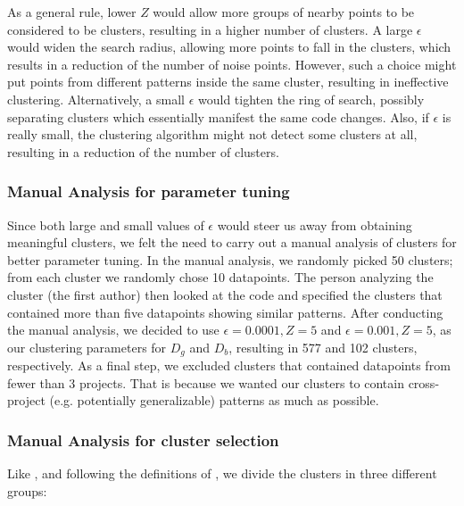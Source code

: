 As a general rule, lower $Z$ would allow more groups of nearby points to be considered to be clusters, resulting in a higher number of clusters. A large $\epsilon$ would widen the search radius, allowing more points to fall in the clusters, which results in a reduction of the number of noise points. However, such a choice might put points from different patterns inside the same cluster, resulting in ineffective clustering. Alternatively, a small $\epsilon$ would tighten the ring of search, possibly separating clusters which essentially manifest the same code changes. Also, if $\epsilon$ is really small, the clustering algorithm might not detect some clusters at all, resulting in a reduction of the number of clusters. 

\subsubsection{\label{sec:manual_analysis_parameter_tuning}Manual Analysis for parameter tuning}

Since both large and small values of $\epsilon$ would steer us away from obtaining meaningful clusters, we felt the need to carry out a manual analysis of clusters for better parameter tuning. In the manual analysis, we randomly picked 50 clusters; from each cluster we randomly chose 10 datapoints. The person analyzing the cluster (the first author) then looked at the code and specified the clusters that contained more than five datapoints showing similar patterns. After conducting the manual analysis, we decided to use $\epsilon=0.0001, Z=5$ and $\epsilon=0.001, Z=5$, as our clustering parameters for $D_g$ and $D_b$, resulting in 577 and 102 clusters, respectively. As a final step, we excluded clusters that contained datapoints from fewer than 3 projects. That is because we wanted our clusters to contain cross-project (e.g. potentially generalizable) patterns as much as possible.  

\subsubsection{\label{sec:manual_analysis_cluster_selection}Manual Analysis for cluster selection}
Like \cite{yang2022mining}, and following the definitions of \cite{cotroneo2019analyzing}, we divide the clusters in three different groups:

